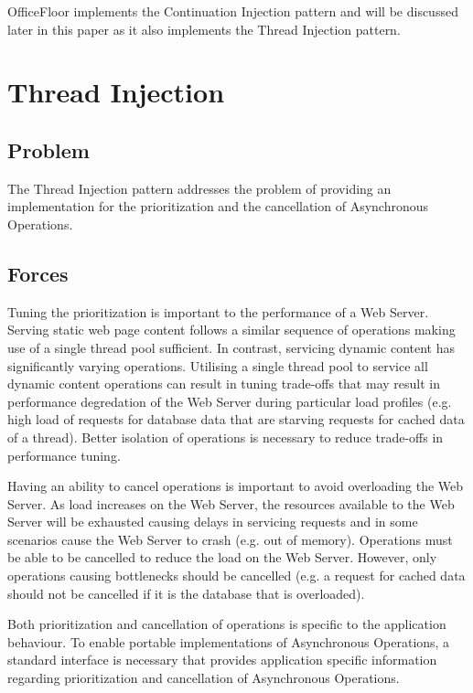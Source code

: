 \documentclass[prodmode]{style/acmlarge}
\begin{document}
OfficeFloor \cite{officefloor} implements the Continuation Injection pattern and
will be discussed later in this paper as it also implements the Thread Injection
pattern.



\section{Thread Injection}


\subsection{Problem}

The Thread Injection pattern addresses the problem of providing an
implementation for the prioritization and the cancellation of Asynchronous
Operations.


\subsection{Forces}

Tuning the prioritization is important to the performance of a Web Server.
Serving static web page content follows a similar sequence of operations making
use of a single thread pool sufficient.  In contrast, servicing dynamic content
has significantly varying operations.  Utilising a single thread pool to service
all dynamic content operations can result in tuning trade-offs that may result
in performance degredation of the Web Server during particular load profiles
(e.g. high load of requests for database data that are starving requests for
cached data of a thread).  Better isolation of operations is necessary to reduce
trade-offs in performance tuning.

Having an ability to cancel operations is important to avoid overloading the Web
Server.  As load increases on the Web Server, the resources available to the Web
Server will be exhausted causing delays in servicing requests and in some
scenarios cause the Web Server to crash (e.g. out of memory).  Operations must
be able to be cancelled to reduce the load on the Web Server.  However, only
operations causing bottlenecks should be cancelled (e.g. a request for cached
data should not be cancelled if it is the database that is overloaded).

Both prioritization and cancellation of operations is specific to the
application behaviour.  To enable portable implementations of Asynchronous
Operations, a standard interface is necessary that provides application specific
information regarding prioritization and cancellation of Asynchronous
Operations.
\end{document}
